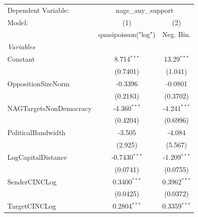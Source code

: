 
\begingroup
\centering
\begin{tabular}{lcc}
   \tabularnewline \midrule \midrule
   Dependent Variable: & \multicolumn{2}{c}{nags\_any\_support}\\
   Model:                                                                           & (1)                  & (2)\\  
                                                                                    &  quasipoisson("log") & Neg. Bin.\\  
   \midrule
   \emph{Variables}\\
   Constant                                                                         & 8.714$^{***}$        & 13.29$^{***}$\\   
                                                                                    & (0.7401)             & (1.041)\\   
   OppositionSizeNorm                                                               & -0.3396              & -0.0801\\   
                                                                                    & (0.2183)             & (0.3702)\\   
   NAGTargetsNonDemocracy                                                           & -4.360$^{***}$       & -4.241$^{***}$\\   
                                                                                    & (0.4204)             & (0.6996)\\   
   PoliticalBandwidth                                                               & -3.505               & -4.084\\   
                                                                                    & (2.925)              & (5.567)\\   
   LogCapitalDistance                                                               & -0.7430$^{***}$      & -1.209$^{***}$\\   
                                                                                    & (0.0741)             & (0.0755)\\   
   SenderCINCLog                                                                    & 0.3400$^{***}$       & 0.3962$^{***}$\\   
                                                                                    & (0.0425)             & (0.0372)\\   
   TargetCINCLog                                                                    & 0.2804$^{***}$       & 0.3359$^{***}$\\   

\end{tabular}
